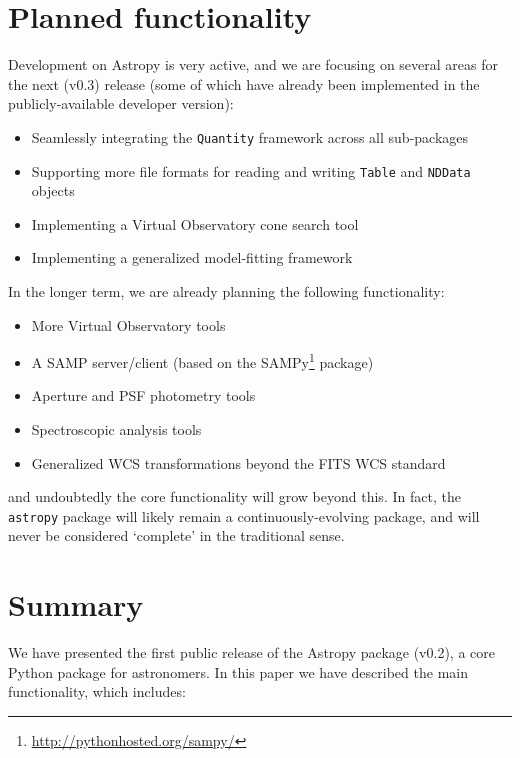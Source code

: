 \documentclass[traditabstract]{aa}
\newcommand{\astropy}{\texttt{astropy}\xspace}
\begin{document}
\section{Planned functionality}

\label{sec:future}


Development on Astropy is very active, and we are focusing on several areas for
the next (v0.3) release (some of which have already been implemented in the
publicly-available developer version):

\begin{itemize}
\item Seamlessly integrating the \texttt{Quantity} framework across all sub-packages
\item Supporting more file formats for reading and writing \texttt{Table} and \texttt{NDData} objects
\item Implementing a Virtual Observatory cone search tool
\item Implementing a generalized model-fitting framework
\end{itemize}

In the longer term, we are already planning the following functionality:

\begin{itemize}
\item More Virtual Observatory tools
\item A SAMP server/client (based on the SAMPy\footnote{\url{http://pythonhosted.org/sampy/}} package)
\item Aperture and PSF photometry tools
\item Spectroscopic analysis tools
\item Generalized WCS transformations beyond the FITS WCS standard
\end{itemize}

\noindent and undoubtedly the core functionality will grow beyond this. In
fact, the \astropy package will likely remain a continuously-evolving package,
and will never be considered `complete' in the traditional sense.

\section{Summary}

\label{sec:summary}


We have presented the first public release of the Astropy package (v0.2), a
core Python package for astronomers. In this paper we have described the main
functionality, which includes:
\end{document}
